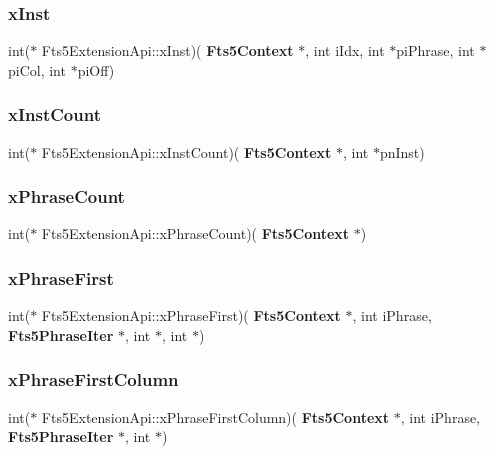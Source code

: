 \subsubsection{xInst}
{\footnotesize\ttfamily int($\ast$ Fts5\+Extension\+Api\+::x\+Inst)(\textbf{ Fts5\+Context} $\ast$, int i\+Idx, int $\ast$pi\+Phrase, int $\ast$pi\+Col, int $\ast$pi\+Off)}

\mbox{\label{struct_fts5_extension_api_a4095d1d4a90ee27fe3586b4dcca16151}} 
\subsubsection{xInstCount}
{\footnotesize\ttfamily int($\ast$ Fts5\+Extension\+Api\+::x\+Inst\+Count)(\textbf{ Fts5\+Context} $\ast$, int $\ast$pn\+Inst)}

\mbox{\label{struct_fts5_extension_api_a79916567d32f1933bb98d5939b8e0885}} 
\subsubsection{xPhraseCount}
{\footnotesize\ttfamily int($\ast$ Fts5\+Extension\+Api\+::x\+Phrase\+Count)(\textbf{ Fts5\+Context} $\ast$)}

\mbox{\label{struct_fts5_extension_api_a0e7fb192d7ca28a5cc4f9ef025586761}} 
\subsubsection{xPhraseFirst}
{\footnotesize\ttfamily int($\ast$ Fts5\+Extension\+Api\+::x\+Phrase\+First)(\textbf{ Fts5\+Context} $\ast$, int i\+Phrase, \textbf{ Fts5\+Phrase\+Iter} $\ast$, int $\ast$, int $\ast$)}

\mbox{\label{struct_fts5_extension_api_ac1936193fd724dd4cac4772add9a724b}} 
\subsubsection{xPhraseFirstColumn}
{\footnotesize\ttfamily int($\ast$ Fts5\+Extension\+Api\+::x\+Phrase\+First\+Column)(\textbf{ Fts5\+Context} $\ast$, int i\+Phrase, \textbf{ Fts5\+Phrase\+Iter} $\ast$, int $\ast$)}

